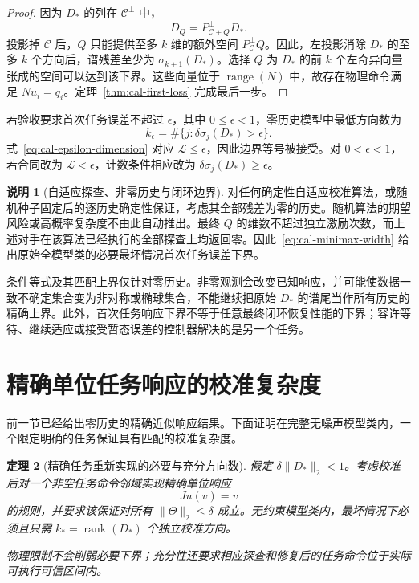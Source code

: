 \documentclass[11pt,a4paper]{article}
\numberwithin{equation}{section}
\newtheorem{theorem}{定理}[section]
\theoremstyle{definition}
\newtheorem{remark}[theorem]{说明}
\begin{document}
\begin{proof}
因为 $D_*$ 的列在 $\mathcal C^\perp$ 中，
\begin{equation}
  D_Q=P_{\mathcal C+Q}^\perp D_* .
\end{equation}
投影掉 $\mathcal C$ 后，$Q$ 只能提供至多 $k$ 维的额外空间 $P_{\mathcal C}^\perp Q$。因此，左投影消除 $D_*$ 的至多 $k$ 个方向后，谱残差至少为 $\sigma_{k+1}(D_*)$。选择 $Q$ 为 $D_*$ 的前 $k$ 个左奇异向量张成的空间可以达到该下界。这些向量位于 $\operatorname{range}(N)$ 中，故存在物理命令满足 $Nu_i=q_i$。定理~\ref{thm:cal-first-loss} 完成最后一步。
\end{proof}

若验收要求首次任务误差不超过 $\epsilon$，其中 $0\le\epsilon<1$，零历史模型中最低方向数为
\begin{equation}
  k_\epsilon=
  \#\{j:\delta\sigma_j(D_*)>\epsilon\}.
  \label{eq:cal-epsilon-dimension}
\end{equation}
式~\eqref{eq:cal-epsilon-dimension} 对应 $\mathcal L\le\epsilon$，因此边界等号被接受。对 $0<\epsilon<1$，若合同改为 $\mathcal L<\epsilon$，计数条件相应改为 $\delta\sigma_j(D_*)\ge\epsilon$。

\begin{remark}[自适应探查、非零历史与闭环边界]
\label{rem:cal-width-scope}
对任何确定性自适应校准算法，或随机种子固定后的逐历史确定性保证，考虑其全部残差为零的历史。随机算法的期望风险或高概率复杂度不由此自动推出。最终 $Q$ 的维数不超过独立激励次数，而上述对手在该算法已经执行的全部探查上均返回零。因此~\eqref{eq:cal-minimax-width} 给出原始全模型类的必要最坏情况首次任务误差下界。

条件等式及其匹配上界仅针对零历史。非零观测会改变已知响应，并可能使数据一致不确定集合变为非对称或椭球集合，不能继续把原始 $D_*$ 的谱尾当作所有历史的精确上界。此外，首次任务响应下界不等于任意最终闭环恢复性能的下界；容许等待、继续适应或接受暂态误差的控制器解决的是另一个任务。
\end{remark}



\section{精确单位任务响应的校准复杂度}
\label{sec:cal-exact-complexity}

前一节已经给出零历史的精确近似响应结果。下面证明在完整无噪声模型类内，一个限定明确的任务保证具有匹配的校准复杂度。

\begin{theorem}[精确任务重新实现的必要与充分方向数]
\label{thm:cal-exact-task}
假定 $\delta\|D_*\|_2<1$。考虑校准后对一个非空任务命令邻域实现精确单位响应
\begin{equation}
  Ju(v)=v
  \label{eq:cal-unit-task}
\end{equation}
的规则，并要求该保证对所有 $\|\Theta\|_2\le\delta$ 成立。无约束模型类内，最坏情况下必须且只需 $k_*=\operatorname{rank}(D_*)$ 个独立校准方向。

物理限制不会削弱必要下界；充分性还要求相应探查和修复后的任务命令位于实际可执行可信区间内。
\end{theorem}
\end{document}
